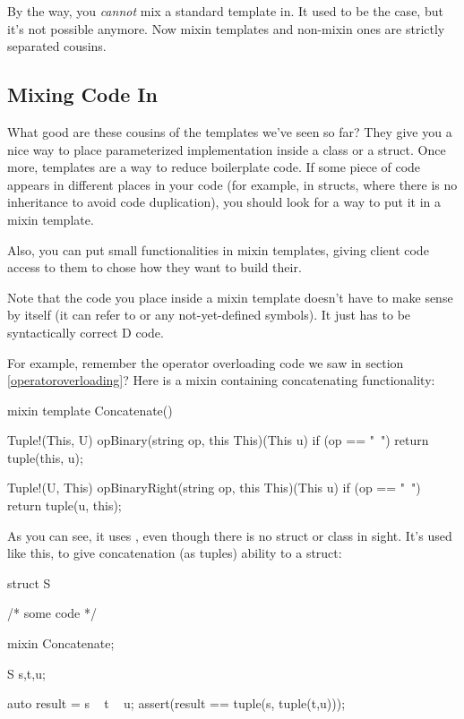 
By the way, you \emph{cannot} mix a standard template in. It used to be the case, but it's not possible anymore. Now mixin templates and non-mixin ones are strictly separated cousins.

\subsection{Mixing Code In}\label{mixincodein}

What good are these cousins of the templates we've seen so far? They give you a nice way to place parameterized implementation inside a class or a struct. Once more, templates are a way to reduce boilerplate code. If some piece of code appears in different places in your code (for example, in structs, where there is no inheritance to avoid code duplication), you should look for a way to put it in a mixin template.

Also, you can put small functionalities in mixin templates, giving client code access to them to chose how they want to build their.

Note that the code you place inside a mixin template doesn't have to make sense by itself (it can refer to  or any not-yet-defined symbols). It just has to be syntactically correct D code.

For example, remember the operator overloading code we saw in section \ref{operatoroverloading}? Here is a mixin containing concatenating functionality:

\begin{dcode}
mixin template Concatenate()
{
    Tuple!(This, U) opBinary(string op, this This)(This u) 
    if (op == "~")
    {
        return tuple(this, u);
    }

    Tuple!(U, This) opBinaryRight(string op, this This)(This u) 
    if (op == "~")
    {
        return tuple(u, this);
    }
}
\end{dcode}

As you can see, it uses , even though there is no struct or class in sight. It's used like this, to give concatenation (as tuples) ability to a struct:

\begin{dcode}
struct S
{
    /* some code */

    mixin Concatenate;
}

S s,t,u;

auto result = s ~ t ~ u;
assert(result == tuple(s, tuple(t,u)));
\end{dcode}

